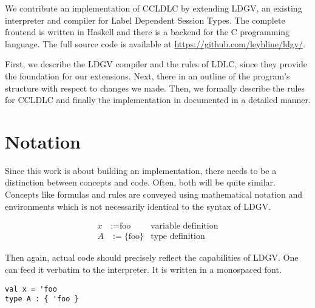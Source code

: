 We contribute an implementation of CCLDLC by extending LDGV, an existing interpreter and compiler for Label Dependent Session Types. The complete frontend is written in Haskell and there is a backend for the C programming language. The full source code is available at \url{https://github.com/leyhline/ldgv/}. 

First, we describe the LDGV compiler and the rules of LDLC, since they provide the foundation for our extensions. Next, there in an outline of the program's structure with respect to changes we made. Then, we formally describe the rules for CCLDLC and finally the implementation in documented in a detailed manner.

\section{Notation}

Since this work is about building an implementation, there needs to be a distinction between concepts and code. Often, both will be quite similar. Concepts like formulas and rules are conveyed using mathematical notation and environments which is not necessarily identical to the syntax of LDGV.

\begin{align*}
 x &:= \text{foo} & \text{variable definition} \\
 A &:= \{ \text{foo} \} & \text{type definition}
\end{align*}

Then again, actual code should precisely reflect the capabilities of LDGV. One can feed it verbatim to the interpreter. It is written in a monospaced font.

\begin{lstlisting}[language=ldgv]
val x = 'foo
type A : { 'foo }
\end{lstlisting}
